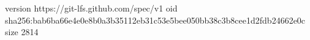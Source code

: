version https://git-lfs.github.com/spec/v1
oid sha256:bab6ba66e4e0e8b0a3b35112eb31c53e5bee050bb38c3b8cee1d2fdb24662e0c
size 2814
